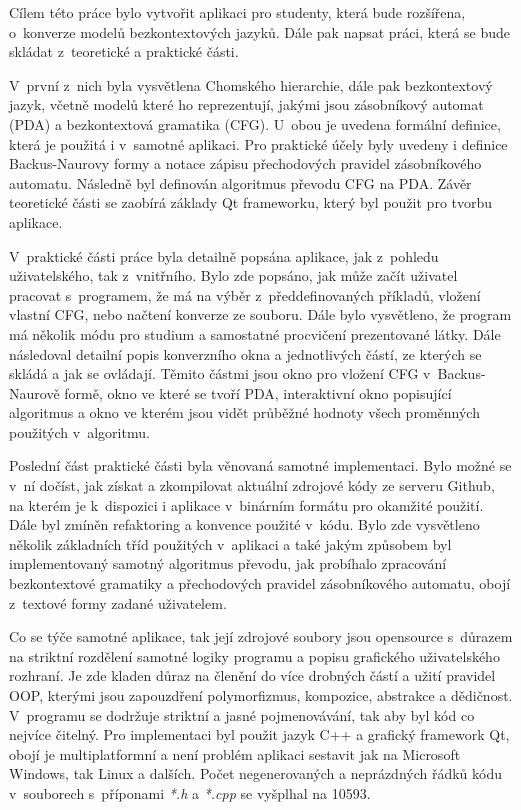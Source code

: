 

Cílem této práce bylo vytvořit aplikaci pro studenty, která bude rozšířena, o~konverze modelů bezkontextových jazyků. Dále pak napsat práci, která se bude skládat z~teoretické a praktické části. 

V~první z~nich byla vysvětlena Chomského hierarchie, dále pak bezkontextový jazyk, včetně modelů které ho reprezentují, jakými jsou zásobníkový automat (PDA) a bezkontextová gramatika (CFG). U~obou je uvedena formální definice, která je použitá i v~samotné aplikaci. Pro praktické účely byly uvedeny i definice Backus-Naurovy formy a notace zápisu přechodových pravidel zásobníkového automatu. Následně byl definován algoritmus převodu CFG na PDA. Závěr teoretické části se zaobírá základy Qt frameworku, který byl použit pro tvorbu aplikace. 

V~praktické části práce byla detailně popsána aplikace, jak z~pohledu uživatelského, tak z~vnitřního. Bylo zde popsáno, jak může začít uživatel pracovat s~programem, že má na výběr z~předdefinovaných příkladů, vložení vlastní CFG, nebo načtení konverze ze souboru. Dále bylo vysvětleno, že program má několik módu pro studium a samostatné procvičení prezentované látky. Dále následoval detailní popis konverzního okna a jednotlivých částí, ze kterých se skládá a jak se ovládají. Těmito částmi jsou okno pro vložení CFG v~Backus-Naurově formě, okno ve které se tvoří PDA, interaktivní okno popisující algoritmus a okno ve kterém jsou vidět průběžné hodnoty všech proměnných použitých v~algoritmu.

Poslední část praktické části byla věnovaná samotné implementaci. Bylo možné se v~ní dočíst, jak získat a zkompilovat aktuální zdrojové kódy ze serveru Github, na kterém je k~dispozici i aplikace v~binárním formátu pro okamžité použití. Dále byl zmíněn refaktoring a konvence použité v~kódu. Bylo zde vysvětleno několik základních tříd použitých v~aplikaci a také jakým způsobem byl implementovaný samotný algoritmus převodu, jak probíhalo zpracování bezkontextové gramatiky a přechodových pravidel zásobníkového automatu, obojí z~textové formy zadané uživatelem.  

Co se týče samotné aplikace, tak její zdrojové soubory jsou opensource s~důrazem na striktní rozdělení samotné logiky programu a popisu grafického uživatelského rozhraní. Je zde kladen důraz na členění do více drobných částí a užití pravidel OOP, kterými jsou zapouzdření polymorfizmus, kompozice, abstrakce a dědičnost. V~programu se dodržuje striktní a jasné pojmenovávání, tak aby byl kód co nejvíce čitelný. Pro implementaci byl použit jazyk C++ a grafický framework Qt, obojí je multiplatformní a není problém aplikaci sestavit jak na Microsoft Windows, tak Linux a dalších. Počet negenerovaných a neprázdných řádků kódu v~souborech s~příponami \textit{*.h} a \textit{*.cpp} se vyšplhal na 10593.

